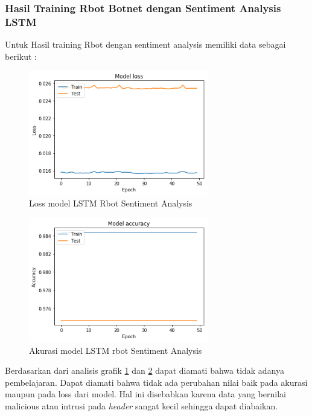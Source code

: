 \documentclass[./skripsi.tex]{subfiles}
\begin{document}
\subsubsection{Hasil Training Rbot Botnet dengan Sentiment Analysis LSTM}
\par Untuk Hasil training Rbot dengan sentiment analysis memiliki data sebagai berikut :

\begin{figure}%
    \centering
    \includegraphics[width=0.7\textwidth]{public/assets/img/lstms_rbot_loss.png}
    \caption{Loss model LSTM Rbot Sentiment Analysis}
    \label{fig:lstms_rbot_loss}
\end{figure}
\begin{figure}%
    \centering
    \includegraphics[width=0.7\textwidth]{public/assets/img/lstms_rbot_acc.png}
    \caption{Akurasi model LSTM rbot Sentiment Analysis}
    \label{fig:lstms_rbot_acc}
\end{figure}

\par Berdasarkan dari analisis grafik \ref{fig:lstms_rbot_loss} dan \ref{fig:lstms_rbot_acc} dapat diamati bahwa tidak adanya pembelajaran. Dapat diamati bahwa tidak ada perubahan nilai baik pada akurasi maupun pada loss dari model. Hal ini disebabkan karena data yang bernilai malicious atau intrusi pada \textit{header} sangat kecil sehingga dapat diabaikan.
\end{document}
